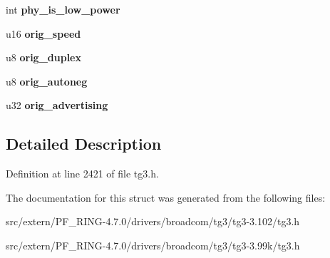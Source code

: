 \begin{DoxyCompactItemize}
\item 
\hypertarget{structtg3__link__config_a7636ba872b79039754d1b6dde94bdd9e}{
int {\bfseries phy\_\-is\_\-low\_\-power}}
\label{structtg3__link__config_a7636ba872b79039754d1b6dde94bdd9e}

\item 
\hypertarget{structtg3__link__config_acd7981b8fc840f360f8f71c7386c2d3e}{
u16 {\bfseries orig\_\-speed}}
\label{structtg3__link__config_acd7981b8fc840f360f8f71c7386c2d3e}

\item 
\hypertarget{structtg3__link__config_a7587b2836f185f1edb18584970e3fb46}{
u8 {\bfseries orig\_\-duplex}}
\label{structtg3__link__config_a7587b2836f185f1edb18584970e3fb46}

\item 
\hypertarget{structtg3__link__config_afa2437920fd06b0c6b7796dd25af4a3f}{
u8 {\bfseries orig\_\-autoneg}}
\label{structtg3__link__config_afa2437920fd06b0c6b7796dd25af4a3f}

\item 
\hypertarget{structtg3__link__config_a29afde5749ea0986bd00786014afa00f}{
u32 {\bfseries orig\_\-advertising}}
\label{structtg3__link__config_a29afde5749ea0986bd00786014afa00f}

\end{DoxyCompactItemize}


\subsection{Detailed Description}


Definition at line 2421 of file tg3.h.



The documentation for this struct was generated from the following files:\begin{DoxyCompactItemize}
\item 
src/extern/PF\_\-RING-\/4.7.0/drivers/broadcom/tg3/tg3-\/3.102/tg3.h\item 
src/extern/PF\_\-RING-\/4.7.0/drivers/broadcom/tg3/tg3-\/3.99k/tg3.h\end{DoxyCompactItemize}
